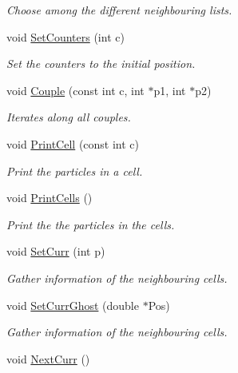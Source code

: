 \begin{DoxyCompactItemize}
\begin{DoxyCompactList}\small\item\em Choose among the different neighbouring lists. \end{DoxyCompactList}\item 
void \hyperlink{classDdLinkedList_aadd6f477626e28e8284b9db4649e841d}{Set\+Counters} (int c)
\begin{DoxyCompactList}\small\item\em Set the counters to the initial position. \end{DoxyCompactList}\item 
void \hyperlink{classDdLinkedList_aabccb7f79ac6e104734750f00fa72b76}{Couple} (const int c, int $\ast$p1, int $\ast$p2)
\begin{DoxyCompactList}\small\item\em Iterates along all couples. \end{DoxyCompactList}\item 
void \hyperlink{classDdLinkedList_af5188eb0e6caae79f8bf349bf2345cf2}{Print\+Cell} (const int c)
\begin{DoxyCompactList}\small\item\em Print the particles in a cell. \end{DoxyCompactList}\item 
void \hyperlink{classDdLinkedList_a1132024d8fdd721fd6a36781d4235162}{Print\+Cells} ()
\begin{DoxyCompactList}\small\item\em Print the the particles in the cells. \end{DoxyCompactList}\item 
void \hyperlink{classDdLinkedList_a74b7b0d716684a7d46993c83795fd9e7}{Set\+Curr} (int p)
\begin{DoxyCompactList}\small\item\em Gather information of the neighbouring cells. \end{DoxyCompactList}\item 
void \hyperlink{classDdLinkedList_acbfe19bc52a783e62b9ed1a4548020be}{Set\+Curr\+Ghost} (double $\ast$Pos)\hypertarget{classDdLinkedList_acbfe19bc52a783e62b9ed1a4548020be}{}\label{classDdLinkedList_acbfe19bc52a783e62b9ed1a4548020be}

\begin{DoxyCompactList}\small\item\em Gather information of the neighbouring cells. \end{DoxyCompactList}\item 
void \hyperlink{classDdLinkedList_a42eeb7049c078ca89057fbc08726eded}{Next\+Curr} ()\hypertarget{classDdLinkedList_a42eeb7049c078ca89057fbc08726eded}{}\label{classDdLinkedList_a42eeb7049c078ca89057fbc08726eded}


\end{DoxyCompactItemize}
